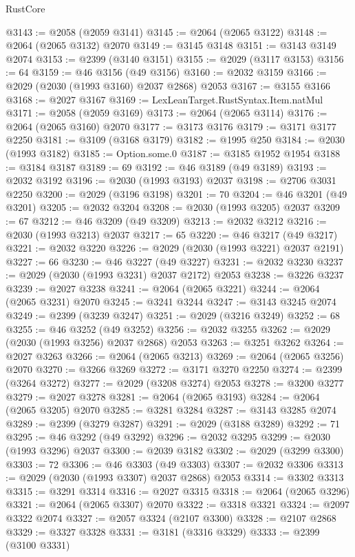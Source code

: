 \begin{lexlean}{RustCore}
\begin{coremodule}
@3143 := @2058 (@2059 @3141)
@3145 := @2064 (@2065 @3122)
@3148 := @2064 (@2065 @3132) @2070
@3149 := @3145 @3148
@3151 := @3143 @3149 @2074
@3153 := @2399 (@3140 @3151)
@3155 := @2029 (@3117 @3153)
@3156 := 64
@3159 := @46 @3156 (@49 @3156)
@3160 := @2032 @3159
@3166 := @2029 (@2030 (@1993 @3160) @2037 @2868) @2053
@3167 := @3155 @3166
@3168 := @2027 @3167
@3169 := LexLeanTarget.RustSyntax.Item.natMul
@3171 := @2058 (@2059 @3169)
@3173 := @2064 (@2065 @3114)
@3176 := @2064 (@2065 @3160) @2070
@3177 := @3173 @3176
@3179 := @3171 @3177 @2250
@3181 := @3109 (@3168 @3179)
@3182 := @1995 @250
@3184 := @2030 (@1993 @3182)
@3185 := Option.some.{0}
@3187 := @3185 @1952 @1954
@3188 := @3184 @3187
@3189 := 69
@3192 := @46 @3189 (@49 @3189)
@3193 := @2032 @3192
@3196 := @2030 (@1993 @3193) @2037
@3198 := @2706 @3031 @2250
@3200 := @2029 (@3196 @3198)
@3201 := 70
@3204 := @46 @3201 (@49 @3201)
@3205 := @2032 @3204
@3208 := @2030 (@1993 @3205) @2037
@3209 := 67
@3212 := @46 @3209 (@49 @3209)
@3213 := @2032 @3212
@3216 := @2030 (@1993 @3213) @2037
@3217 := 65
@3220 := @46 @3217 (@49 @3217)
@3221 := @2032 @3220
@3226 := @2029 (@2030 (@1993 @3221) @2037 @2191)
@3227 := 66
@3230 := @46 @3227 (@49 @3227)
@3231 := @2032 @3230
@3237 := @2029 (@2030 (@1993 @3231) @2037 @2172) @2053
@3238 := @3226 @3237
@3239 := @2027 @3238
@3241 := @2064 (@2065 @3221)
@3244 := @2064 (@2065 @3231) @2070
@3245 := @3241 @3244
@3247 := @3143 @3245 @2074
@3249 := @2399 (@3239 @3247)
@3251 := @2029 (@3216 @3249)
@3252 := 68
@3255 := @46 @3252 (@49 @3252)
@3256 := @2032 @3255
@3262 := @2029 (@2030 (@1993 @3256) @2037 @2868) @2053
@3263 := @3251 @3262
@3264 := @2027 @3263
@3266 := @2064 (@2065 @3213)
@3269 := @2064 (@2065 @3256) @2070
@3270 := @3266 @3269
@3272 := @3171 @3270 @2250
@3274 := @2399 (@3264 @3272)
@3277 := @2029 (@3208 @3274) @2053
@3278 := @3200 @3277
@3279 := @2027 @3278
@3281 := @2064 (@2065 @3193)
@3284 := @2064 (@2065 @3205) @2070
@3285 := @3281 @3284
@3287 := @3143 @3285 @2074
@3289 := @2399 (@3279 @3287)
@3291 := @2029 (@3188 @3289)
@3292 := 71
@3295 := @46 @3292 (@49 @3292)
@3296 := @2032 @3295
@3299 := @2030 (@1993 @3296) @2037
@3300 := @2039 @3182
@3302 := @2029 (@3299 @3300)
@3303 := 72
@3306 := @46 @3303 (@49 @3303)
@3307 := @2032 @3306
@3313 := @2029 (@2030 (@1993 @3307) @2037 @2868) @2053
@3314 := @3302 @3313
@3315 := @3291 @3314
@3316 := @2027 @3315
@3318 := @2064 (@2065 @3296)
@3321 := @2064 (@2065 @3307) @2070
@3322 := @3318 @3321
@3324 := @2097 @3322 @2074
@3327 := @2057 @3324 (@2107 @3300)
@3328 := @2107 @2868
@3329 := @3327 @3328
@3331 := @3181 (@3316 @3329)
@3333 := @2399 (@3100 @3331)

\end{coremodule}
\end{lexlean}
